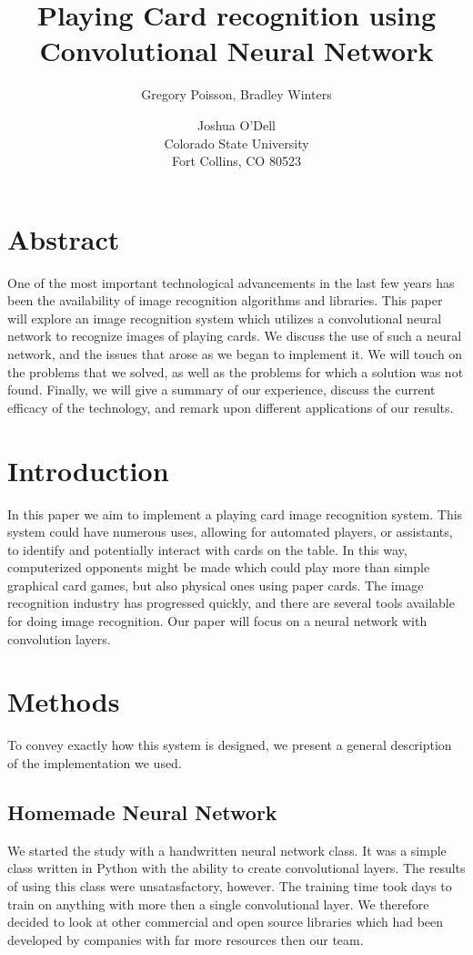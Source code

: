 \documentclass[letterpaper]{article}
\title{Playing Card recognition using Convolutional Neural Network}
\author{Gregory Poisson, Bradley Winters \and Joshua O'Dell \\ Colorado State University \\ Fort Collins, CO 80523 }
\begin{document}
\maketitle

\section{Abstract}

One of the most important technological advancements in the last few years has been the availability of image recognition algorithms and libraries.  This paper will explore an image recognition system which utilizes a convolutional neural network to recognize images of playing cards. We discuss the use of such a neural network, and the issues that arose as we began to implement it.  We will touch on the problems that we solved, as well as the problems for which a solution was not found.  Finally, we will give a summary of our experience, discuss the current efficacy of the technology, and remark upon different applications of our results.

\section{Introduction}

In this paper we aim to implement a playing card image recognition system.  This system could have numerous uses, allowing for automated players, or assistants, to identify and potentially interact with cards on the table. In this way, computerized opponents might be made which could play more than simple graphical card games, but also physical ones using paper cards.
The image recognition industry has progressed quickly, and there are several tools available for doing image recognition.  Our paper will focus on a neural network with convolution layers.

\section{Methods}
To convey exactly how this system is designed, we present a general description of the implementation we used.

\subsection{Homemade Neural Network}
We started the study with a handwritten neural network class.  It was a simple class written in Python with the ability to create convolutional layers.  The results of using this class were unsatasfactory, however.  The training time took days to train on anything with more then a single convolutional layer.  We therefore decided to look at other commercial and open source libraries which had been developed by companies with far more resources then our team.
\end{document}

